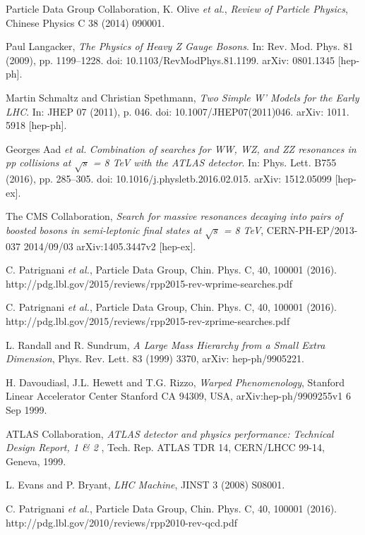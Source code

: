 \documentclass[UKenglish,texlive=2013]{\ATLASLATEXPATH atlasdoc}
\newcommand{\cme}{\sqrt{s}}
\begin{document}
\begin{thebibliography}{9}

  Particle Data Group Collaboration, K. Olive \emph{et al.},
  \emph{ Review of Particle Physics},
Chinese Physics C 38 (2014) 090001.

Paul Langacker,
\emph{The Physics of Heavy
Z Gauge Bosons}. In: Rev. Mod. Phys.
81 (2009), pp. 1199–1228. doi: 10.1103/RevModPhys.81.1199. arXiv: 0801.1345
[hep-ph].

Martin Schmaltz and Christian Spethmann,
\emph{Two Simple W’ Models for the Early
LHC}. In: JHEP 07 (2011), p. 046. doi: 10.1007/JHEP07(2011)046. arXiv: 1011.
5918 [hep-ph].

Georges Aad {\it et al.}
\emph{Combination of searches for WW, WZ, and ZZ resonances
in pp collisions at $\sqrt{s}$ = 8 TeV with the ATLAS detector}. In: Phys. Lett. B755
(2016), pp. 285–305. doi: 10.1016/j.physletb.2016.02.015. arXiv: 1512.05099
[hep-ex].

The CMS Collaboration,
\emph{Search for massive resonances decaying into pairs of boosted bosons in semi-leptonic final states at $\cme$ = 8 TeV},
CERN-PH-EP/2013-037
2014/09/03
arXiv:1405.3447v2 [hep-ex].

C. Patrignani \emph{et al.},
Particle Data Group, Chin. Phys. C, 40, 100001 (2016).
http://pdg.lbl.gov/2015/reviews/rpp2015-rev-wprime-searches.pdf

C. Patrignani \emph{et al.},
Particle Data Group, Chin. Phys. C, 40, 100001 (2016).
http://pdg.lbl.gov/2015/reviews/rpp2015-rev-zprime-searches.pdf

L. Randall and R. Sundrum,
\emph{A Large Mass Hierarchy from a Small Extra Dimension},
Phys. Rev. Lett. 83 (1999) 3370, arXiv: hep-ph/9905221.

H. Davoudiasl, J.L. Hewett and T.G. Rizzo,
\emph{Warped Phenomenology},
Stanford Linear Accelerator Center
Stanford CA 94309, USA,
arXiv:hep-ph/9909255v1 6 Sep 1999.

  ATLAS Collaboration,
  \emph{ATLAS detector and physics performance: Technical Design Report, 1 \& 2} ,
  Tech. Rep. ATLAS TDR 14, CERN/LHCC 99-14, Geneva, 1999.

L. Evans and P. Bryant,
\emph{LHC Machine}, JINST 3 (2008) S08001.

C. Patrignani \emph{et al.},
Particle Data Group, Chin. Phys. C, 40, 100001 (2016).
http://pdg.lbl.gov/2010/reviews/rpp2010-rev-qcd.pdf


\end{thebibliography}
\end{document}
